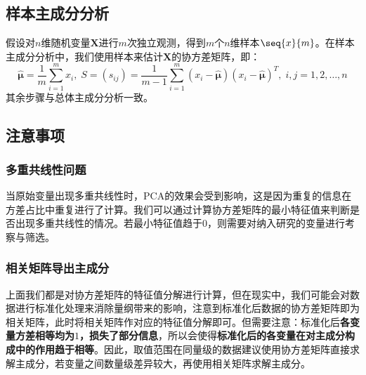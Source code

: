 \subsection{样本主成分分析}
假设对$n$维随机变量$\mathbf{X}$进行$m$次独立观测，得到$m$个$n$维样本$\seq{x}{m}$。在样本主成分分析中，我们使用样本来估计$\mathbf{X}$的协方差矩阵，即：
\begin{equation*}
	\hat{\boldsymbol{\mu}}=\frac{1}{m}\sum_{i=1}^{m}x_i,\;S=(s_{ij})=\frac{1}{m-1}\sum_{i=1}^{m}(x_i-\hat{\boldsymbol{\mu}})(x_i-\hat{\boldsymbol{\mu}})^T,\;i,j=1,2,\dots,n
\end{equation*}
其余步骤与总体主成分分析一致。

\subsection{注意事项}
\subsubsection{多重共线性问题}
当原始变量出现多重共线性时，PCA的效果会受到影响，这是因为重复的信息在方差占比中重复进行了计算。我们可以通过计算协方差矩阵的最小特征值来判断是否出现多重共线性的情况。若最小特征值趋于$0$，则需要对纳入研究的变量进行考察与筛选。
\subsubsection{相关矩阵导出主成分}
上面我们都是对协方差矩阵的特征值分解进行计算，但在现实中，我们可能会对数据进行标准化处理来消除量纲带来的影响，注意到标准化后数据的协方差矩阵即为相关矩阵，此时将相关矩阵作对应的特征值分解即可。但需要注意：标准化后\textbf{各变量方差相等均为$1$，损失了部分信息}，所以会使得\textbf{标准化后的各变量在对主成分构成中的作用趋于相等}。因此，取值范围在同量级的数据建议使用协方差矩阵直接求解主成分，若变量之间数量级差异较大，再使用相关矩阵求解主成分。
